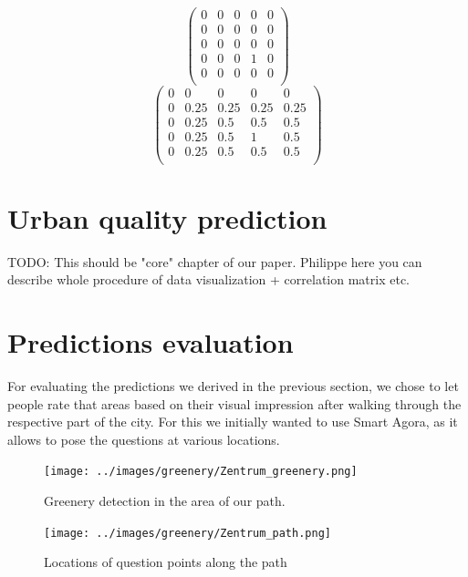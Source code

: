 \documentclass[letterpaper]{article}
\begin{document}
\begin{equation}
\begin{pmatrix}
    0 & 0 & 0 & 0 & 0 \\
    0 & 0 & 0 & 0 & 0 \\
    0 & 0 & 0 & 0 & 0 \\
    0 & 0 & 0 & 1 & 0 \\
    0 & 0 & 0 & 0 & 0 \\
\end{pmatrix}
\label{eq:MatA}
\end{equation}
\begin{equation}
\begin{pmatrix}
    0 & 0 & 0 & 0 & 0 \\
    0 & 0.25 & 0.25 & 0.25 & 0.25 \\
    0 & 0.25 & 0.5 & 0.5 & 0.5 \\
    0 & 0.25 & 0.5 & 1 & 0.5 \\
    0 & 0.25 & 0.5 & 0.5 & 0.5 \\
\end{pmatrix}
\label{eq:MatB}
\end{equation}

\section{Urban quality prediction}\label{sec:predictions}
TODO: This should be "core" chapter of our paper. Philippe here you can describe whole procedure of data visualization + correlation matrix etc.

\section{Predictions evaluation}\label{sec:exp}
For evaluating the predictions we derived in the previous section, we chose to let people rate that areas based on their visual impression after walking through the respective part of the city. For this we initially wanted to use Smart Agora, as it allows to pose the questions at various locations.

\begin{figure}[htb]
    \centering
    \texttt{[image: ../images/greenery/Zentrum\_greenery.png]}
    \caption{Greenery detection in the area of our path.}
    \label{fig:path_greenery}
\end{figure}

\begin{figure}[htb]
	\centering
	\texttt{[image: ../images/greenery/Zentrum\_path.png]}
	\caption{Locations of question points along the path}
	\label{fig:path_points}
\end{figure}
\end{document}
